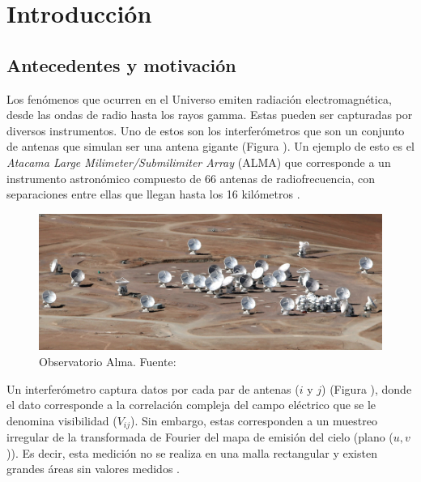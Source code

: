 \chapter{Introducci\'on}
\label{cap:introduccion}

\section{Antecedentes y motivaci\'on}
\label{intro:motivacion}

Los fenómenos que ocurren en el Universo emiten radiación electromagnética, desde las ondas de radio hasta los rayos gamma. Estas pueden ser capturadas por diversos instrumentos. Uno de estos son los interferómetros que son un conjunto de antenas que simulan ser una antena gigante \citep{AlmaInt} (Figura ). Un ejemplo de esto es el \textit{Atacama Large Milimeter/Submilimiter Array} (ALMA) que corresponde a un instrumento astronómico compuesto de 66 antenas de radiofrecuencia, con separaciones entre ellas que llegan hasta los 16 kilómetros \citep{AlmaWork}. 

\begin{figure}[!ht]
	\centering
	\captionsetup{justification=centering}
	\includegraphics[scale=0.4]{images/Alma.jpg}
	\caption[Observatorio Alma.]{Observatorio Alma. Fuente: \citep{AlmaInt}}
	\label{fig:alma}
\end{figure}

Un interferómetro captura datos por cada par de antenas ($i$ y $j$) (Figura ), donde el dato corresponde a la correlación compleja del campo eléctrico que se le denomina visibilidad ($V_{ij}$). Sin embargo, estas corresponden a un muestreo irregular de la transformada de Fourier del mapa de emisión del cielo (plano ($u,v$)). Es decir, esta medición no se realiza en una malla rectangular y existen grandes áreas sin valores medidos \citep{synthesis}. 

